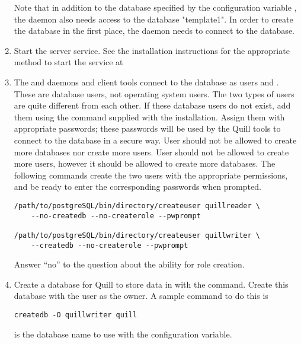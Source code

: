 \begin{enumerate}
Note that in addition to the database specified by
the configuration variable ,
the  daemon also needs access to the database
"template1".
In order to create the database in the first place, 
the  daemon needs to connect to the database.

\item Start the  server service. See the
installation instructions for the appropriate method to start the service at

\item The  and  daemons and client tools connect
to the database as users  and 
.
These are database users, not operating system users.
The two types of users are quite different from each other.
If these database users do not exist,
add them using the 
 command supplied with the installation.
Assign them with appropriate passwords;
these passwords will be used by the Quill tools to connect
to the database in a secure way.
User  should not be allowed to create
more databases nor create more users.
User  should
not be allowed to create more users,
however it should be allowed to create more databases.
The following commands create the two users
with the appropriate permissions,
and be ready to enter the corresponding passwords when prompted.

\footnotesize
\begin{verbatim}
/path/to/postgreSQL/bin/directory/createuser quillreader \
	--no-createdb --no-createrole --pwprompt

/path/to/postgreSQL/bin/directory/createuser quillwriter \
	--createdb --no-createrole --pwprompt
\end{verbatim}
\normalsize

Answer ``no'' to the question about the ability for role creation.

\item Create a database for Quill to store data in
with the \verb@createdb@ command. 
Create this database with the  user as the owner.
A sample command to do this is
\footnotesize
\begin{verbatim}
createdb -O quillwriter quill
\end{verbatim}
\normalsize
\verb@quill@ is the database name to use with the 
configuration variable.


\end{enumerate}
